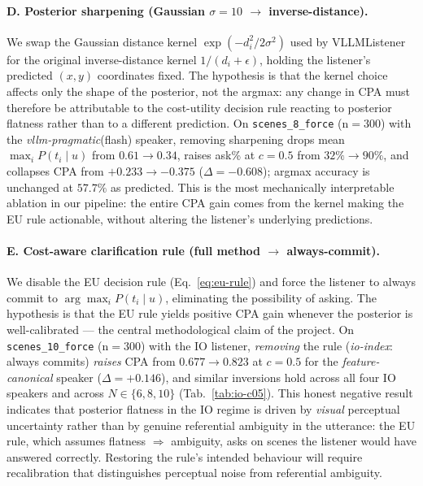 \paragraph{D. Posterior sharpening
            (Gaussian $\sigma{=}10$ $\to$ inverse-distance).}
We swap the Gaussian distance kernel
$\exp(-d_i^2/2\sigma^2)$ used by VLLMListener for the original
inverse-distance kernel $1/(d_i{+}\epsilon)$, holding the listener's
predicted $(x,y)$ coordinates fixed.
The hypothesis is that the kernel choice affects only the shape of the
posterior, not the argmax: any change in CPA must therefore be
attributable to the cost-utility decision rule reacting to posterior
flatness rather than to a different prediction.
On \texttt{scenes\_8\_force} (n${=}300$) with the
\textit{vllm-pragmatic}(flash) speaker, removing sharpening drops mean
$\max_i P(t_i\mid u)$ from $0.61 \to 0.34$, raises ask\% at $c{=}0.5$
from $32\%\to 90\%$, and collapses CPA from $+0.233 \to -0.375$
($\Delta {=} {-}0.608$); argmax accuracy is unchanged at $57.7\%$ as
predicted.
This is the most mechanically interpretable ablation in our pipeline:
the entire CPA gain comes from the kernel making the EU rule actionable,
without altering the listener's underlying predictions.

\paragraph{E. Cost-aware clarification rule (full method $\to$ always-commit).}
We disable the EU decision rule (Eq.~\ref{eq:eu-rule}) and force the
listener to always commit to $\arg\max_i P(t_i\mid u)$, eliminating the
possibility of asking.
The hypothesis is that the EU rule yields positive CPA gain whenever the
posterior is well-calibrated --- the central methodological claim of the
project.
On \texttt{scenes\_10\_force} (n${=}300$) with the IO listener,
\emph{removing} the rule (\textit{io-index}: always commits) \emph{raises}
CPA from $0.677 \to 0.823$ at $c{=}0.5$ for the
\textit{feature-canonical} speaker ($\Delta {=} +0.146$), and similar
inversions hold across all four IO speakers and across $N \in \{6,8,10\}$
(Tab.~\ref{tab:io-c05}).
This honest negative result indicates that posterior flatness in the IO
regime is driven by \emph{visual} perceptual uncertainty rather than by
genuine referential ambiguity in the utterance: the EU rule, which
assumes flatness $\Rightarrow$ ambiguity, asks on scenes the listener
would have answered correctly.  Restoring the rule's intended behaviour
will require recalibration that distinguishes perceptual noise from
referential ambiguity.


